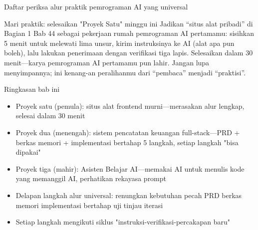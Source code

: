 \begin{center}\small\color{gray}Daftar periksa alur praktik pemrograman AI yang universal\end{center}

\begin{tcbpractice}{Mari praktik: selesaikan "Proyek Satu" minggu ini}
Jadikan “situs alat pribadi” di Bagian 1 Bab 44 sebagai pekerjaan rumah pemrograman AI pertamamu: sisihkan 5 menit untuk melewati lima unsur, kirim instruksinya ke AI (alat apa pun boleh), lalu lakukan penerimaan dengan verifikasi tiga lapis. Selesaikan dalam 30 menit—karya pemrograman AI pertamamu pun lahir. Jangan lupa menyimpannya; ini kenang-an peralihanmu dari “pembaca” menjadi “praktisi”.

\end{tcbpractice}

\begin{tcbsummary}{Ringkasan bab ini}
\begin{itemize}
  \item Proyek satu (pemula): situs alat frontend murni—merasakan alur lengkap, selesai dalam 30 menit
  \item Proyek dua (menengah): sistem pencatatan keuangan full-stack—PRD + berkas memori + implementasi bertahap 5 langkah, setiap langkah "bisa dipakai"
  \item Proyek tiga (mahir): Asisten Belajar AI—memakai AI untuk menulis kode yang memanggil AI, perhatikan rekayasa prompt
  \item Delapan langkah alur universal: renungkan kebutuhan pecah PRD berkas memori implementasi bertahap uji tinjau iterasi
  \item Setiap langkah mengikuti siklus "instruksi-verifikasi-percakapan baru"
\end{itemize}

\end{tcbsummary}
